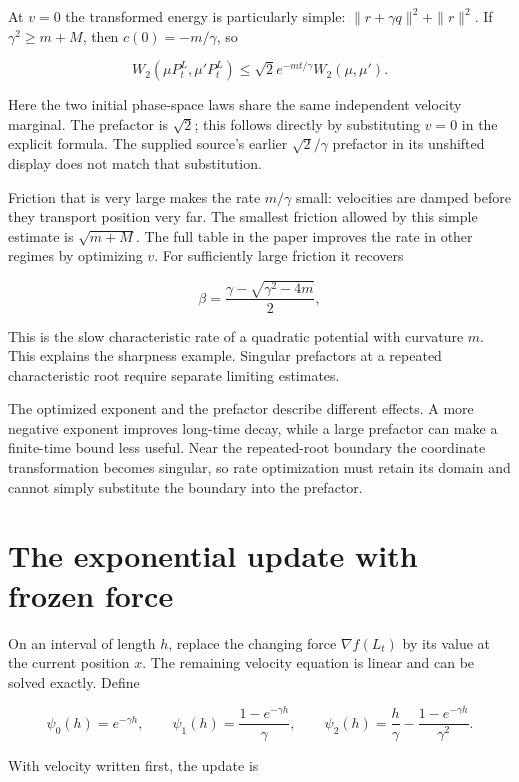 \documentclass[11pt,a4paper]{report}
\begin{document}
At \(v=0\) the transformed energy is particularly simple:
\(\|r+\gamma q\|^2+\|r\|^2\). If \(\gamma^2\ge m+M\), then
\(c(0)=-m/\gamma\), so


\[W_2(\mu P_t^L,\mu'P_t^L)
\le\sqrt2e^{-mt/\gamma}W_2(\mu,\mu').\]


Here the two initial phase-space laws share the same independent velocity
marginal. The prefactor is \(\sqrt2\); this follows directly by substituting
\(v=0\) in the explicit formula. The supplied source's earlier
\(\sqrt2/\gamma\) prefactor in its unshifted display does not match
that substitution.




Friction that is very large makes the rate \(m/\gamma\) small: velocities
are damped before they transport position very far. The smallest friction
allowed by this simple estimate is \(\sqrt{m+M}\). The full table in the
paper improves the rate in other regimes by optimizing \(v\). For sufficiently
large friction it recovers


\[\beta=\frac{\gamma-\sqrt{\gamma^2-4m}}2,\]


This is the slow characteristic rate of a quadratic potential with curvature \(m\).
This explains the sharpness example. Singular prefactors at a repeated
characteristic root require separate limiting estimates.



The optimized exponent and the prefactor describe different effects. A more negative exponent improves long-time decay, while a large prefactor can make a finite-time bound less useful. Near the repeated-root boundary the coordinate transformation becomes singular, so rate optimization must retain its domain and cannot simply substitute the boundary into the prefactor.

\section{\texorpdfstring{The exponential update with frozen force}{The exponential update with frozen force}}


On an interval of length \(h\), replace the changing force
\(\nabla f(L_t)\) by its value at the current position \(x\). The remaining
velocity equation is linear and can be solved exactly. Define


\[\psi_0(h)=e^{-\gamma h},\qquad
\psi_1(h)=\frac{1-e^{-\gamma h}}\gamma,\qquad
\psi_2(h)=\frac h\gamma-\frac{1-e^{-\gamma h}}{\gamma^2}.\]


With velocity written first, the update is
\end{document}
